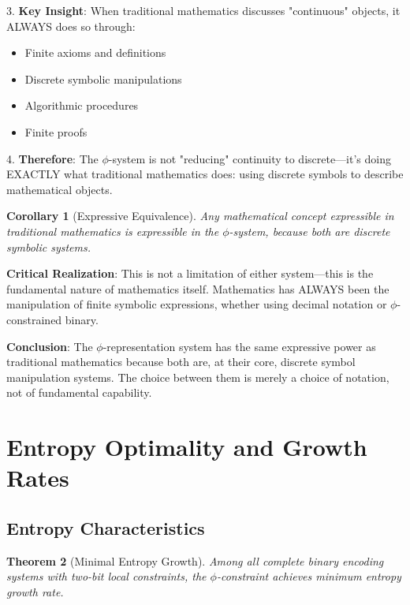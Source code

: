 \documentclass[12pt,letterpaper]{article}
\newtheorem{theorem}{Theorem}[section]
\newtheorem{corollary}[theorem]{Corollary}
\begin{document}
3. \textbf{Key Insight}: When traditional mathematics discusses "continuous" objects, it ALWAYS does so through:
   \begin{itemize}
   \item Finite axioms and definitions
   \item Discrete symbolic manipulations
   \item Algorithmic procedures
   \item Finite proofs
   \end{itemize}

4. \textbf{Therefore}: The $\phi$-system is not "reducing" continuity to discrete—it's doing EXACTLY what traditional mathematics does: using discrete symbols to describe mathematical objects.

\begin{corollary}[Expressive Equivalence]
Any mathematical concept expressible in traditional mathematics is expressible in the $\phi$-system, because both are discrete symbolic systems.
\end{corollary}

\textbf{Critical Realization}: This is not a limitation of either system—this is the fundamental nature of mathematics itself. Mathematics has ALWAYS been the manipulation of finite symbolic expressions, whether using decimal notation or $\phi$-constrained binary.

\textbf{Conclusion}: The $\phi$-representation system has the same expressive power as traditional mathematics because both are, at their core, discrete symbol manipulation systems. The choice between them is merely a choice of notation, not of fundamental capability.

\section{Entropy Optimality and Growth Rates}

\subsection{Entropy Characteristics}

\begin{theorem}[Minimal Entropy Growth]
Among all complete binary encoding systems with two-bit local constraints, the $\phi$-constraint achieves minimum entropy growth rate.
\end{theorem}
\end{document}
